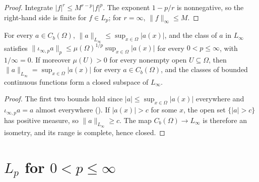 \begin{proof}
\leanok
Integrate $|f|^r \leq M^{r-p} |f|^p$. The exponent $1 - p/r$ is nonnegative, so the right-hand
side is finite for $f \in L_p$; for $r = \infty$, $\|f\|_\infty \leq M$.
\end{proof}

\begin{lemma}
\label{lem:bc-linfty}
\leanok
For every $a \in C_b(\Omega)$, $\|a\|_{L_\infty} \leq \sup_{x \in \Omega} |a(x)|$, and the class
of $a$ in $L_\infty$ satisfies $\|\iota_{\infty,p} a\|_p \leq \mu(\Omega)^{1/p}
\sup_{x \in \Omega} |a(x)|$ for every $0 < p \leq \infty$, with $1/\infty = 0$. If moreover
$\mu(U) > 0$ for every nonempty open $U \subseteq \Omega$, then
$\|a\|_{L_\infty} = \sup_{x \in \Omega} |a(x)|$ for every $a \in C_b(\Omega)$, and the classes
of bounded continuous functions form a closed subspace of $L_\infty$.
\end{lemma}

\begin{proof}
\leanok
{}
The first two bounds hold since $|a| \leq \sup_{x \in \Omega} |a(x)|$ everywhere and
$\iota_{\infty,p} a = a$ almost everywhere (). If $|a(x)| > c$ for
some $x$, the open set $\{|a| > c\}$ has positive measure, so
$\|a\|_{L_\infty} \geq c$. The map $C_b(\Omega) \to L_\infty$ is therefore an isometry, and
its range is complete, hence closed.
\end{proof}

\section{\texorpdfstring{$L_p$ for $0 < p \leq \infty$}{L\_p for 0 < p <= infinity}}
\label{sec:lp-quasi}

